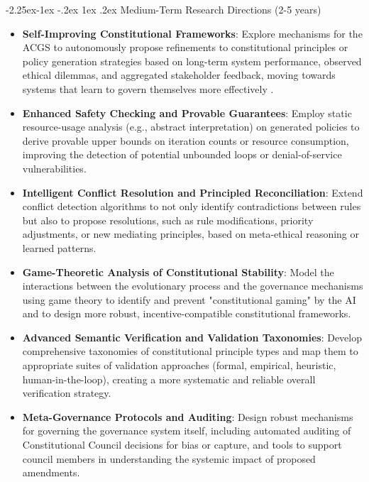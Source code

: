 \documentclass[manuscript,screen,review,anonymous,9pt]{acmart}
\makeatletter
\renewcommand\subsection{\@startsection{subsection}{2}{\z@}%
  {-2.25ex\@plus -1ex \@minus -.2ex}%
  {1ex \@plus .2ex}%
  {\normalfont\large\bfseries}}
\makeatother
\begin{document}
\subsection{Medium-Term Research Directions (2-5 years)}
\label{subsec:medium_term_research}
\begin{itemize}[leftmargin=*,itemsep=1pt,parsep=1pt]
    \item \textbf{Self-Improving Constitutional Frameworks}: Explore mechanisms for the ACGS to autonomously propose refinements to constitutional principles or policy generation strategies based on long-term system performance, observed ethical dilemmas, and aggregated stakeholder feedback, moving towards systems that learn to govern themselves more effectively \cite{Zhao2025AbsoluteZero}.
    \item \textbf{Enhanced Safety Checking and Provable Guarantees}: Employ static resource-usage analysis (e.g., abstract interpretation) on generated policies to derive provable upper bounds on iteration counts or resource consumption, improving the detection of potential unbounded loops or denial-of-service vulnerabilities.
    \item \textbf{Intelligent Conflict Resolution and Principled Reconciliation}: Extend conflict detection algorithms to not only identify contradictions between rules but also to propose resolutions, such as rule modifications, priority adjustments, or new mediating principles, based on meta-ethical reasoning or learned patterns.
    \item \textbf{Game-Theoretic Analysis of Constitutional Stability}: Model the interactions between the evolutionary process and the governance mechanisms using game theory to identify and prevent "constitutional gaming" by the AI and to design more robust, incentive-compatible constitutional frameworks.
    \item \textbf{Advanced Semantic Verification and Validation Taxonomies}: Develop comprehensive taxonomies of constitutional principle types and map them to appropriate suites of validation approaches (formal, empirical, heuristic, human-in-the-loop), creating a more systematic and reliable overall verification strategy.
    \item \textbf{Meta-Governance Protocols and Auditing}: Design robust mechanisms for governing the governance system itself, including automated auditing of Constitutional Council decisions for bias or capture, and tools to support council members in understanding the systemic impact of proposed amendments.
\end{itemize}
\end{document}

